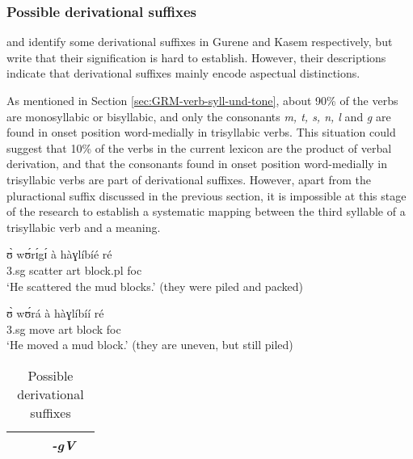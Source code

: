 \begin{exe}
\begin{exe}
\begin{exe}
{\begin{exe}
\begin{exe}
\begin{exe}
\begin{exe}
\begin{exe}
\begin{exe}
\begin{exe}
\begin{xlist}
\begin{exe}
\begin{exe}
\begin{exe}
\begin{exe}
\begin{exe}
\begin{exe}
\begin{exe}
\begin{exe}
\begin{exe}
\begin{exe}
\begin{exe}
\begin{exe}
\begin{exe}
\begin{exe}
\begin{exe}
\subsubsection{Possible derivational suffixes}
\label{sec:GRM-deri-suff}


\citet[37]{Daku09} and \citet[69]{Bonv88} identify some derivational suffixes 
in 
Gurene and Kasem respectively, but write that their signification is hard to 
establish.  However, their descriptions indicate that  derivational suffixes 
mainly encode aspectual distinctions.

As mentioned in Section \ref{sec:GRM-verb-syll-und-tone}, about 90\% of the
verbs are monosyllabic or bisyllabic, and  only the consonants {\it m,
t, s, n,  l} and {\it g} are found  in onset position word-medially in
trisyllabic verbs. This situation could suggest that 10\% of the verbs in the
current lexicon are the product of verbal derivation, and that the consonants
found  in onset position word-medially in trisyllabic verbs are part of
derivational suffixes. However, apart from the pluractional suffix discussed in
the previous section,  it is impossible at this stage of the research to
establish a systematic mapping between the third syllable of a trisyllabic verb
and a meaning.  


\ea
    \ea\label{ex:plur-ex}
\gll   ʊ̀ wʊ́rɪ́gɪ́ à hàɣlíbíé ré\\
{\sc 3.sg} scatter {\sc art} block.{\sc pl} {\sc foc}\\ 
\glt `He scattered the mud blocks.' (they were piled and packed)

    \ex\label{ex:}
\gll  ʊ̀ wʊ́rá à hàɣlíbíí ré\\
 {\sc 3.sg} move {\sc art} block  {\sc foc} \\
\glt `He moved a mud block.' (they are uneven, but still piled)
\z 
 \z
 
 
 
\begin{table}[!htb]
\small
\centering
\caption{Possible derivational suffixes\label{tab:GRM-der-suff}}

\begin{tabular}{lllll}
\lsptoprule

 &&&{\it -gV}&\\\midrule


\end{tabular}
\end{table}
\end{exe}
\end{exe}
\end{exe}
\end{exe}
\end{exe}
\end{exe}
\end{exe}
\end{exe}
\end{exe}
\end{exe}
\end{exe}
\end{exe}
\end{exe}
\end{exe}
\end{exe}
\end{xlist}
\end{exe}
\end{exe}
\end{exe}
\end{exe}
\end{exe}
\end{exe}
\end{exe}}
\end{exe}
\end{exe}
\end{exe}
